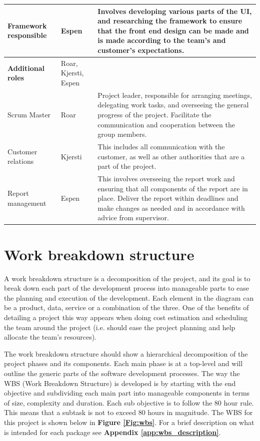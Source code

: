 \begin{table}[!h]
\begin{tabular}{ | p{3.7cm} | p{2.8cm} | p{10.5cm} |}
			Framework responsible & Espen & Involves developing various parts of the UI, and researching the framework to ensure that the front end design can be made and is made according to the team's and customer's expectations. \\ \hline
			
			\textbf{Additional roles} & Roar, Kjersti, Espen & \\ \hline
			
			Scrum Master & Roar & Project leader, responsible for arranging meetings, delegating work tasks, and overseeing the general progress of the project. Facilitate the communication and cooperation between the group members. \\ \hline
			
			Customer relations & Kjersti & This includes all communication with the customer, as well as other authorities that are a part of the project. \\ \hline
			
			Report management & Espen & This involves overseeing the report work and ensuring that all components of the report are in place. Deliver the report within deadlines and make changes as needed and in accordance with advice from supervisor. \\ \hline
		\end{tabular}
	\label{Tab:roles}
\end{table}

\section{Work breakdown structure}

A work breakdown structure is a decomposition of the project, and its goal is to break down each part of the development process into manageable parts to ease the planning and execution of the development. Each element in the diagram can be a product, data, service or a combination of the three. One of the benefits of detailing a project this way appears when doing cost estimation and scheduling the team around the project (i.e. should ease the project planning and help allocate the team's resources).\newline

The work breakdown structure should show a hierarchical decomposition of the project phases and its components. Each main phase is at a top-level and will outline the generic parts of the software development processes. The way the WBS (Work Breakdown Structure) is developed is by starting with the end objective and subdividing each main part into manageable components in terms of size, complexity and duration. Each sub objective is to follow the 80 hour rule. This means that a subtask is not to exceed 80 hours in magnitude. The WBS for this project is shown below in \textbf{Figure \ref{Fig:wbs}}. For a brief description on what is intended for each package see \textbf{Appendix \ref{app:wbs_description}}.

